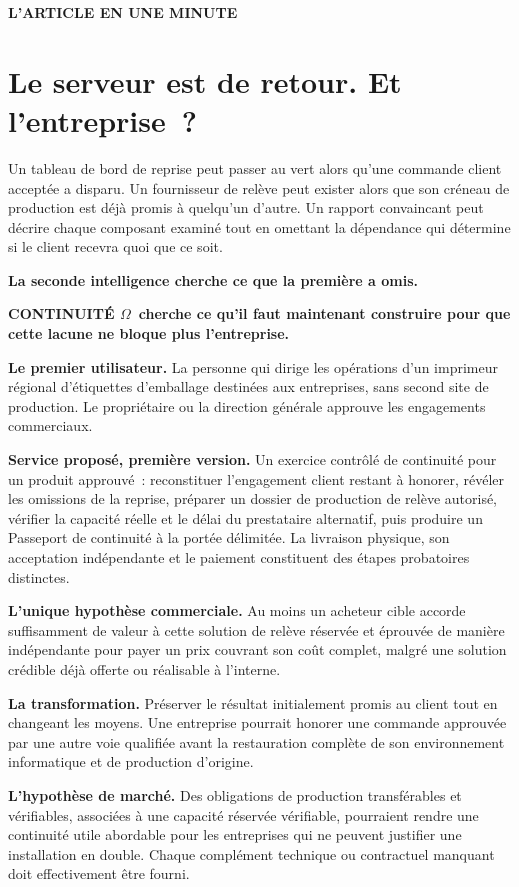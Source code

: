 \documentclass[11pt,a4paper]{article}
\newcommand{\kicker}[1]{{\sffamily\small\bfseries\color{gold}\MakeUppercase{#1}}}
\newcommand{\om}{CONTINUITÉ $\Omega$}
\begin{document}
\kicker{L’article en une minute}
\section*{Le serveur est de retour. Et l’entreprise~?}
Un tableau de bord de reprise peut passer au vert alors qu’une commande client acceptée a disparu. Un fournisseur de relève peut exister alors que son créneau de production est déjà promis à quelqu’un d’autre. Un rapport convaincant peut décrire chaque composant examiné tout en omettant la dépendance qui détermine si le client recevra quoi que ce soit.

\begin{insight}
\large\textbf{La seconde intelligence cherche ce que la première a omis.}\par
\textbf{\om\ cherche ce qu’il faut maintenant construire pour que cette lacune ne bloque plus l’entreprise.}
\end{insight}

\textbf{Le premier utilisateur.} La personne qui dirige les opérations d’un imprimeur régional d’étiquettes d’emballage destinées aux entreprises, sans second site de production. Le propriétaire ou la direction générale approuve les engagements commerciaux.

\textbf{Service proposé, première version.} Un exercice contrôlé de continuité pour un produit approuvé~: reconstituer l’engagement client restant à honorer, révéler les omissions de la reprise, préparer un dossier de production de relève autorisé, vérifier la capacité réelle et le délai du prestataire alternatif, puis produire un Passeport de continuité à la portée délimitée. La livraison physique, son acceptation indépendante et le paiement constituent des étapes probatoires distinctes.

\textbf{L’unique hypothèse commerciale.} Au moins un acheteur cible accorde suffisamment de valeur à cette solution de relève réservée et éprouvée de manière indépendante pour payer un prix couvrant son coût complet, malgré une solution crédible déjà offerte ou réalisable à l’interne.

\textbf{La transformation.} Préserver le résultat initialement promis au client tout en changeant les moyens. Une entreprise pourrait honorer une commande approuvée par une autre voie qualifiée avant la restauration complète de son environnement informatique et de production d’origine.

\textbf{L’hypothèse de marché.} Des obligations de production transférables et vérifiables, associées à une capacité réservée vérifiable, pourraient rendre une continuité utile abordable pour les entreprises qui ne peuvent justifier une installation en double. Chaque complément technique ou contractuel manquant doit effectivement être fourni.
\end{document}
